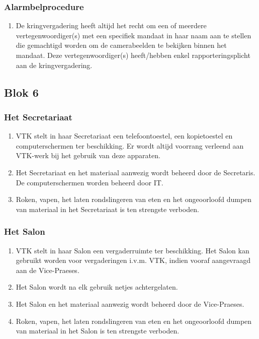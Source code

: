     \subsubsection{Alarmbelprocedure}
    \begin{enumerate}
        \item De kringvergadering heeft altijd het recht om een of meerdere vertegenwoordiger(s) met een specifiek mandaat in haar naam aan te stellen die gemachtigd worden om de camerabeelden te bekijken binnen het mandaat. Deze vertegenwoordiger(s) heeft/hebben enkel rapporteringsplicht aan de kringvergadering. 
    \end{enumerate}

\subsection{Blok 6}

    \subsubsection{Het Secretariaat}\label{art:secri}
    \begin{enumerate}
    \item VTK stelt in haar Secretariaat een telefoontoestel, een kopietoestel en computerschermen ter beschikking. Er wordt altijd voorrang verleend aan VTK-werk bij het gebruik van deze apparaten.
    \item Het Secretariaat en het materiaal aanwezig wordt beheerd door de Secretaris. De computerschermen worden beheerd door IT.
    \item Roken, vapen, het laten rondslingeren van eten en het ongeoorloofd dumpen van materiaal in het Secretariaat is ten strengste verboden.
    \end{enumerate}

    \subsubsection{Het Salon}\label{art:salon}
    \begin{enumerate}
    \item VTK stelt in haar Salon een vergaderruimte ter beschikking. Het Salon kan gebruikt worden voor vergaderingen i.v.m. VTK, indien vooraf aangevraagd aan de Vice-Praeses.
    \item Het Salon wordt na elk gebruik netjes achtergelaten.
    \item Het Salon en het materiaal aanwezig wordt beheerd door de Vice-Praeses.
    \item Roken, vapen, het laten rondslingeren van eten en het ongeoorloofd dumpen van materiaal in het Salon is ten strengste verboden.
    \end{enumerate}

